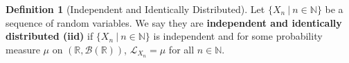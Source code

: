 \documentclass[11pt]{article}
\theoremstyle{definition}
\newtheorem{defn}{Definition}[section]
\theoremstyle{theorem}
\newcommand{\R}[0]{\mathbb{R}}
\newcommand{\N}[0]{\mathbb{N}}
\begin{document}
\begin{defn}[Independent and Identically Distributed]
	Let \( \{ X_n\ |\ n \in \N \} \) be a sequence of random variables. We say they are \textbf{independent and identically distributed (iid)} if \( \{ X_n\ |\ n \in \N \} \) is independent and for some probability measure \( \mu\) on \( ( \R, \mathcal{B}(\R) ) \), \( \mathcal{L}_{X_n} = \mu \) for all \( n \in \N \). 
\end{defn}
\end{document}
